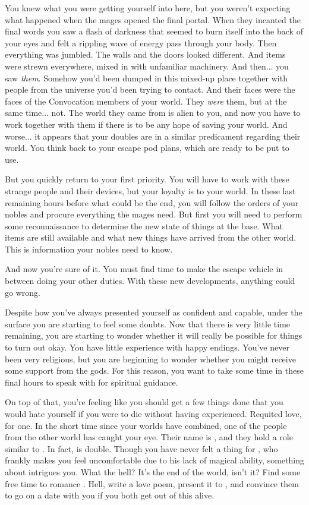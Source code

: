 \documentclass[char]{guildcamp3}
\begin{document}
You knew what you were getting yourself into here, but you weren't expecting what happened when the mages opened the final portal. When they incanted the final words you saw a flash of darkness that seemed to burn itself into the back of your eyes and felt a rippling wave of energy pass through your body. Then everything was jumbled. The walls and the doors looked different. And items were strewn everywhere, mixed in with unfamiliar machinery. And then... you saw \emph{them}. Somehow you'd been dumped in this mixed-up place together with people from the universe you'd been trying to contact. And their faces were the faces of the Convocation members of your world. They \emph{were} them, but at the same time... not. The world they came from is alien to you, and now you have to work together with them if there is to be any hope of saving your world. And worse... it appears that your doubles are in a similar predicament regarding their world. You think back to your escape pod plans, which are ready to be put to use.

But you quickly return to your first priority. You will have to work with these strange people and their devices, but your loyalty is to your world. In these last remaining hours before what could be the end, you will follow the orders of your nobles and procure everything the mages need. But first you will need to perform some reconnaissance to determine the new state of things at the base. What items are still available and what new things have arrived from the other world. This is information your nobles need to know.

And now you're sure of it. You must find time to make the escape vehicle in between doing your other duties. With these new developments, anything could go wrong.

Despite how you've always presented yourself as confident and capable, under the surface you are starting to feel some doubts. Now that there is very little time remaining, you are starting to wonder whether it will really be possible for things to turn out okay. You have little experience with happy endings. You've never been very religious, but you are beginning to wonder whether you might receive some support from the gods. For this reason, you want to take some time in these final hours to speak with \cPaladin{} for spiritual guidance.

On top of that, you're feeling like you should get a few things done that you would hate yourself if you were to die without having experienced. Requited love, for one. In the short time since your worlds have combined, one of the people from the other world has caught your eye. Their name is \cPoliOne{\intro}, and they hold a role similar to \cNobleOne{}. In fact, \cPoliOne{} is \cNobleOne{\their} double. Though you have never felt a thing for \cNobleOne{}, who frankly makes you feel uncomfortable due to his lack of magical ability, something about \cPoliOne{} intrigues you. What the hell? It's the end of the world, isn't it? Find some free time to romance \cPoliOne{\them}. Hell, write \cPoliOne{\them} a love poem, present it to \cPoliOne{\them}, and convince them to go on a date with you if you both get out of this alive. 
\end{document}
